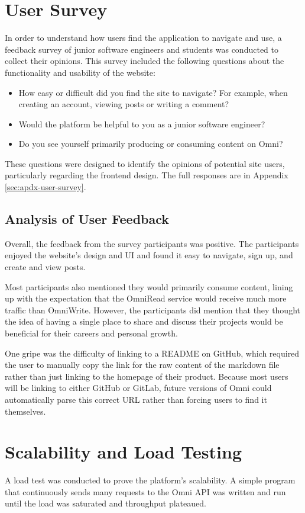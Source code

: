 \section{User Survey}
In order to understand how users find the application to navigate and use, a feedback survey of junior software engineers and students was conducted to collect their opinions.
This survey included the following questions about the functionality and usability of the website:
\begin{itemize}
    \item How easy or difficult did you find the site to navigate? For example, when creating an account, viewing posts or writing a comment?
    \item Would the platform be helpful to you as a junior software engineer?
    \item Do you see yourself primarily producing or consuming content on Omni?
\end{itemize}
These questions were designed to identify the opinions of potential site users, particularly regarding the frontend design.
The full responses are in Appendix \ref{sec:apdx-user-survey}.

\subsection{Analysis of User Feedback}
Overall, the feedback from the survey participants was positive.
The participants enjoyed the website's design and UI and found it easy to navigate, sign up, and create and view posts. 

Most participants also mentioned they would primarily consume content, lining up with the expectation that the OmniRead service would receive much more traffic than OmniWrite.
However, the participants did mention that they thought the idea of having a single place to share and discuss their projects would be beneficial for their careers and personal growth. 

One gripe was the difficulty of linking to a README on GitHub, which required the user to manually copy the link for the raw content of the markdown file rather than just linking to the homepage of their product.
Because most users will be linking to either GitHub or GitLab, future versions of Omni could automatically parse this correct URL rather than forcing users to find it themselves.

\section{Scalability and Load Testing}
\label{sec:load-testing}
A load test was conducted to prove the platform's scalability.
A simple program that continuously sends many requests to the Omni API was written and run until the load was saturated and throughput plateaued.

